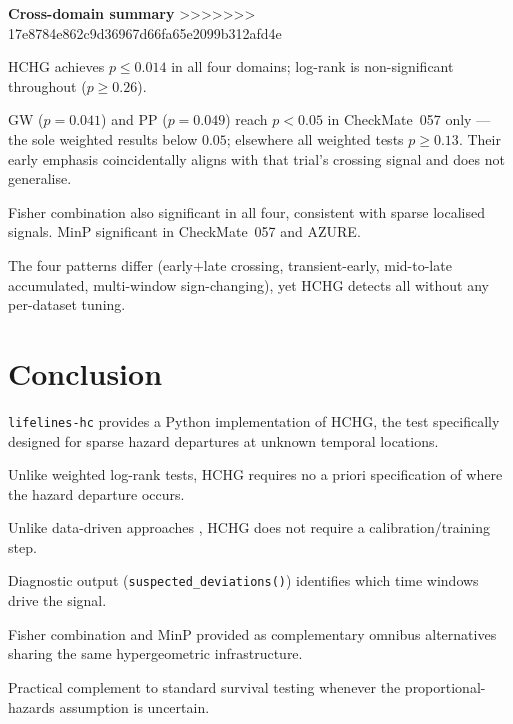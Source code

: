 \documentclass[unnumsec,webpdf,contemporary,large]{oup-authoring-template}
\let\origitemize\itemize
\let\origenditemize\enditemize
\renewenvironment{itemize}{%
  \origitemize
  \setlength{\itemsep}{1pt}%
  \setlength{\parskip}{0pt}%
  \setlength{\topsep}{3pt}%
}{\origenditemize}
\begin{document}
\textbf{Cross-domain summary}
>>>>>>> 17e8784e862c9d36967d66fa65e2099b312afd4e
\begin{itemize}
  \item HCHG achieves $p \leq 0.014$ in all four domains; log-rank is
        non-significant throughout ($p \geq 0.26$).
  \item GW ($p=0.041$) and PP ($p=0.049$) reach $p<0.05$ in CheckMate~057
        only — the sole weighted results below $0.05$; elsewhere all
        weighted tests $p \geq 0.13$. Their early emphasis coincidentally
        aligns with that trial's crossing signal and does not generalise.
  \item Fisher combination also significant in all four, consistent
        with sparse localised signals. MinP significant in CheckMate~057
        and AZURE.
  \item The four patterns differ (early+late crossing, transient-early,
        mid-to-late accumulated, multi-window sign-changing), yet HCHG
        detects all without any per-dataset tuning.
\end{itemize}


\section{Conclusion}

\begin{itemize}
  \item \texttt{lifelines-hc} provides a Python implementation of HCHG,
        the test specifically designed for sparse hazard departures at
        unknown temporal locations.
  \item Unlike weighted log-rank tests, HCHG requires no a priori
        specification of where the hazard departure occurs.
  \item Unlike data-driven approaches \cite{yang2010improved}, HCHG does not require a calibration/training step. 
  \item Diagnostic output (\texttt{suspected\_deviations()}) identifies
        which time windows drive the signal.
  \item Fisher combination and MinP provided as complementary omnibus
        alternatives sharing the same hypergeometric infrastructure.
  \item Practical complement to standard survival testing whenever the
        proportional-hazards assumption is uncertain.
\end{itemize}
\end{document}

